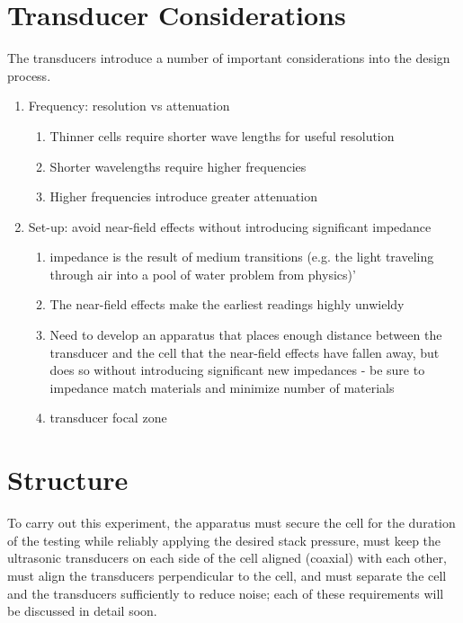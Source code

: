 \section{Transducer Considerations}
The transducers introduce a number of important considerations into the design process.
\begin{enumerate}
    \item Frequency: resolution vs attenuation
    \begin{enumerate}
        \item Thinner cells require shorter wave lengths for useful resolution
	    \item Shorter wavelengths require higher frequencies
		\item Higher frequencies introduce greater attenuation
	\end{enumerate}
	\item Set-up: avoid near-field effects without introducing significant impedance
		\begin{enumerate} 
		    \item impedance is the result of medium transitions (e.g. the light traveling through air into a pool of water problem from physics)'
		    \item The near-field effects make the earliest readings highly unwieldy
	        \item Need to develop an apparatus that places enough distance between the transducer and the cell that the near-field effects have fallen away, but does so without introducing significant new impedances - be sure to impedance match materials and minimize number of materials
	        \item transducer focal zone
	    \end{enumerate}
\end{enumerate}


\section{Structure}
To carry out this experiment, the apparatus must secure the cell for the duration of the testing while reliably applying the desired stack pressure, must keep the ultrasonic transducers on each side of the cell aligned (coaxial) with each other, must align the transducers perpendicular to the cell, and must separate the cell and the transducers sufficiently to reduce noise; each of these requirements will be discussed in detail soon.

